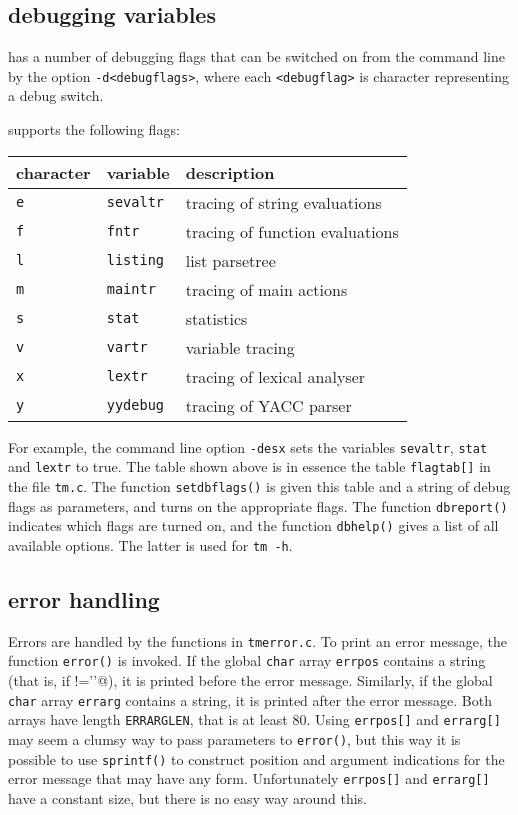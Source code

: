 \subsection{debugging variables}
{\Tm} has a number of debugging flags
that can be switched on from the command line by the
option \verb!-d<debugflags>!,
where each \verb!<debugflag>! is character representing a debug switch.
\par
{\Tm} supports the following flags:
\par
\begin{tabular}{lll}
character & variable & description \\
\hline
\texttt{e} & \texttt{sevaltr} & tracing of string evaluations \\
\texttt{f} & \texttt{fntr} & tracing of function evaluations \\
\texttt{l} & \texttt{listing} & list parsetree \\
\texttt{m} & \texttt{maintr} & tracing of main actions \\
\texttt{s} & \texttt{stat} & statistics \\
\texttt{v} & \texttt{vartr} & variable tracing \\
\texttt{x} & \texttt{lextr} & tracing of lexical analyser \\
\texttt{y} & \texttt{yydebug} & tracing of YACC parser \\
\end{tabular}
\par
For example, the command line option \verb!-desx! sets the variables
\texttt{sevaltr}, \texttt{stat} and \texttt{lextr} to true.
The table shown above is in essence the table \texttt{flagtab[]}
in the file \texttt{tm.c}.
The function \texttt{setdbflags()} is given this table and a string of debug
flags as parameters, and turns on the appropriate flags.
The function \texttt{dbreport()} indicates which flags are turned on,
and the function \texttt{dbhelp()} gives a list of all available options.
The latter is used for \verb!tm -h!.
\subsection{error handling}
Errors are handled by the functions in \texttt{tmerror.c}.
To print an error message, the function \texttt{error()} is invoked.
If the global \texttt{char} array \texttt{errpos} contains a string (that
is, if \verb@errpos[0]!='\0'@),
it is printed before the error message. 
Similarly, if the global \texttt{char} array \texttt{errarg} contains a string,
it is printed after the error message.
Both arrays have length \texttt{ERRARGLEN}, that is at least 80.
Using \texttt{errpos[]} and \texttt{errarg[]} may seem a clumsy way to pass
parameters to \texttt{error()},
but this way it is possible to use \texttt{sprintf()} to construct position
and argument indications for the error message that may have any form.
Unfortunately \texttt{errpos[]} and \texttt{errarg[]} have a constant size,
but there is no easy way around this.

